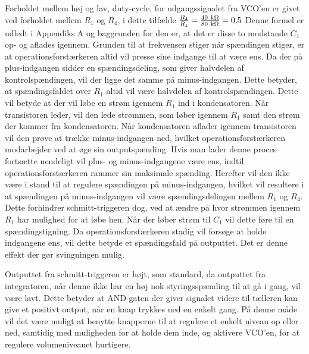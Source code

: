 Forholdet mellem høj og lav, duty-cycle, for udgangssignalet fra VCO'en er givet ved forholdet mellem $R_1$ og $R_4$, i dette tilfælde $\frac{R_4}{R_1} = \frac{40~\mathrm{k}\ohm}{80~\mathrm{k}\ohm}=0.5$ Denne formel er udledt i Appendiks A og baggrunden for den er, at det er disse to modstande $C_1$ op- og aflades igennem. Grunden til at frekvensen stiger når spændingen stiger, er at operationsforstærkeren altid vil presse sine indgange til at være ens. Da der på plus-indgangen sidder en spændingsdeling, som giver halvdelen af kontrolspændingen, vil der ligge det samme på minus-indgangen. Dette betyder, at spændingsfaldet over $R_1$ altid vil være halvdelen af kontrolspændingen. Dette vil betyde at der vil løbe en strøm igennem $R_1$ ind i kondensatoren. Når transistoren leder, vil den lede strømmen, som løber igennem $R_1$ samt den strøm der kommer fra kondensatoren. Når kondensatoren aflader igennem transistoren vil den prøve at trække minus-indgangen ned, hvilket operationsforstærkeren modarbejder ved at øge sin outputspænding. Hvis man lader denne proces fortsætte uendeligt vil plus- og minus-indgangene være ens, indtil operationsforstærkeren rammer sin maksimale spænding. Herefter vil den ikke være i stand til at regulere spændingen på minus-indgangen, hvilket vil resultere i at spændingen på minus-indgangen vil være spændingsdelingen mellem $R_1$ og $R_4$. Dette forhindrer schmitt-triggeren dog, ved at ændre på hvor strømmen igennem $R_1$ har mulighed for at løbe hen. Når der løber strøm til $C_1$ vil dette føre til en spændingstigning. Da operationsforstærkeren stadig vil forsøge at holde indgangene ens, vil dette betyde et spændingsfald på outputtet. Det er denne effekt der gør svingningen mulig.

Outputtet fra schmitt-triggeren er højt, som standard, da outputtet fra integratoren, når denne ikke har en høj nok styringsspænding til at gå i gang, vil være lavt. Dette betyder at AND-gaten der giver signalet videre til tælleren kan give et positivt output, når en knap trykkes ned en enkelt gang. På denne måde vil det være muligt at benytte knapperne til at regulere et enkelt niveau op eller ned, samtidig med muligheden for at holde dem inde, og aktivere VCO'en, for at regulere volumeniveauet hurtigere.




